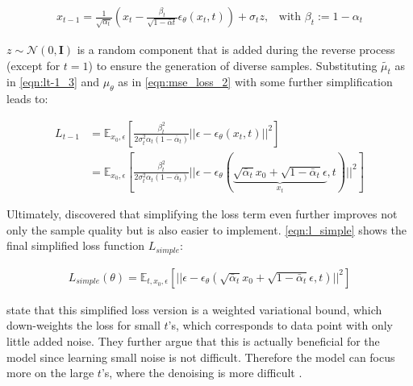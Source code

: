 \begin{equation}
  \begin{align*}
    \label{eqn:xt-1}
    x_{t-1} = \frac{1}{\sqrt{\alpha_t}}\left(x_t - \frac{\beta_t}{\sqrt{1-\bar{\alpha}t}}\epsilon_{\theta}(x_t,t)\right) + \sigma_t z \textrm{,}\quad
    \textrm{with } \beta_t := 1-\alpha_t
  \end{align*}
\end{equation}

\noindent $z\sim\mathcal{N}(0,\textbf{I})$ is a random component that is added during the reverse process (except for $t=1$) to ensure the generation of diverse samples.
\newpage
Substituting $\tilde{\mu_t}$ as in \autoref{eqn:lt-1_3} and $\mu_\theta$ as in \autoref{eqn:mse_loss_2} with some further simplification leads to:

\begin{equation}
  \begin{align*}
    \label{eqn:eqn:lt-1_4}
    L_{t-1} &= \mathbb{E}_{x_0,\epsilon} \left[  \frac{\beta^2_t}{2\sigma_t^2 \alpha_t (1-\bar{\alpha}_t)} ||\epsilon - \epsilon_\theta(x_t,t)||^2 \right] \\
    &= \mathbb{E}_{x_0,\epsilon} \left[  \frac{\beta^2_t}{2\sigma_t^2 \alpha_t (1-\bar{\alpha}_t)} ||\epsilon - \epsilon_\theta( \underbrace{\sqrt{\bar{\alpha}_t} x_0 + \sqrt{1-\bar{\alpha}_t}\epsilon}_{x_t}, t)||^2 \right]
  \end{align*}
\end{equation}

Ultimately, \textcite[p. 5]{ho2020DenoisingDiffusionProbabilistic} discovered that simplifying the loss term even further improves not only the sample quality but is also easier to implement.
\autoref{eqn:l_simple} shows the final simplified loss function $L_{simple}$:

\begin{equation}
  \begin{align*}
    \label{eqn:l_simple}
    L_{simple}(\theta) = \mathbb{E}_{t, x_0,\epsilon} \left[ ||\epsilon - \epsilon_\theta( \sqrt{\bar{\alpha}_t} x_0 + \sqrt{1-\bar{\alpha}_t}\epsilon, t)||^2 \right]
  \end{align*}
\end{equation}

\textcite{ho2020DenoisingDiffusionProbabilistic} state that this simplified loss version is a weighted variational bound, which down-weights the loss for small $t$'s, which corresponds to data point with only little added noise.
They further argue that this is actually beneficial for the model since learning small noise is not difficult. 
Therefore the model can focus more on the large $t$'s, where the denoising is more difficult \cite{ho2020DenoisingDiffusionProbabilistic}.

